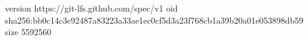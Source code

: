 version https://git-lfs.github.com/spec/v1
oid sha256:bb0c14c3e92487a83223a33ae1ec0cf5d3a23f768cb1a39b20a01e053898db59
size 5592560
